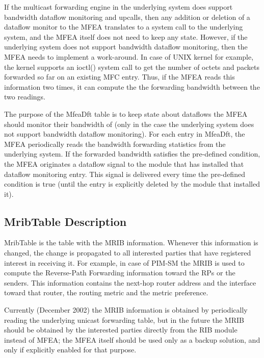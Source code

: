 \documentclass[11pt]{article}
\begin{document}
If the multicast forwarding engine in the underlying system does
support bandwidth dataflow monitoring and upcalls, then any addition or
deletion of a dataflow monitor to the MFEA translates to a system call
to the underlying system, and the MFEA itself does not need to keep any
state. However, if the underlying system does not support bandwidth
dataflow monitoring, then the MFEA needs to implement a work-around.
In case of UNIX kernel for example, the kernel supports an ioctl()
system call to get the number of octets and packets forwarded so far on
an existing MFC entry. Thus, if the MFEA reads this information two times,
it can compute the the forwarding bandwidth between the two readings.

The purpose of the MfeaDft table is to keep state about dataflows the
MFEA should monitor their bandwidth of (only in the case the underlying
system does not support bandwidth dataflow monitoring). For each entry
in MfeaDft, the MFEA periodically reads the bandwidth forwarding
statistics from the underlying system. If the forwarded bandwidth
satisfies the pre-defined condition, the MFEA originates a dataflow
signal to the module that has installed that dataflow monitoring
entry. This signal is delivered every time the pre-defined condition is
true (until the entry is explicitly deleted by the module that installed
it).

\subsection{MribTable Description}

MribTable is the table with the MRIB information. Whenever this
information is changed, the change is propagated to all interested
parties that have registered interest in receiving it. For example, in
case of PIM-SM the MRIB is used to compute the Reverse-Path Forwarding
information toward the RPs or the senders. This information contains the
next-hop router address and the interface toward that router, the
routing metric and the metric preference.

Currently (December 2002) the MRIB information is obtained by
periodically reading the underlying unicast forwarding table, but in the
future the MRIB should be obtained by the interested parties directly
from the RIB module instead of MFEA; the MFEA itself should be used only
as a backup solution, and only if explicitly enabled for that purpose.

\end{document}
